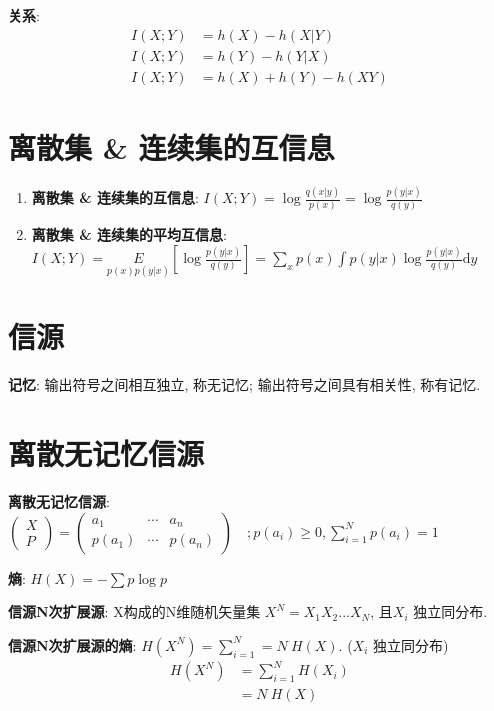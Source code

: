 \documentclass{article}
\newcommand{\env}[2]{\begin{#1}#2\end{#1}}
\newcommand{\d}{\mathrm d}
\newcommand{\l}{\left}
\newcommand{\r}{\right}
\begin{document}
                \textbf{关系}:
                    \env{align*}{
                        I(X;Y) &= h(X)-h(X|Y) \\
                        I(X;Y) &= h(Y)-h(Y|X) \\
                        I(X;Y) &= h(X)+h(Y)-h(X Y)
                    }
                    
            \section{离散集 \& 连续集的互信息}
                \env{enumerate}{
                    \item \textbf{离散集 \& 连续集的互信息}: $I(X;Y)=\log \frac{q(x|y)}{p(x)}=\log \frac{p(y|x)}{q(y)}$
                    \item \textbf{离散集 \& 连续集的平均互信息}: $I(X;Y)=\underset{p(x) p(y|x)}{E}\l[\log \frac{p(y|x)}{q(y)}\r]=\sum_{x} p(x) \int p(y|x) \log \frac{p(y|x)}{q(y)} \d y$
                }
            
            
\section{信源}

    \textbf{记忆}: 输出符号之间相互独立, 称无记忆; 输出符号之间具有相关性, 称有记忆.
    
    \section{离散无记忆信源}
        \textbf{离散无记忆信源}:  $ \l(\begin{array}{l} X \\ P \end{array}\r)
                 = \l(\begin{array}{lll}
                    a_1 & \cdots & a_{n} \\ p\l(a_1\r) & \cdots & p\l(a_{n}\r)
                \end{array}\r) \quad;
                p\l(a_{i}\r) \geqslant 0, \sum_{i=1}^N p\l(a_{i}\r)=1$
                
            
        \textbf{熵}: $H(X) = -\sum p \log p$
        
        \textbf{信源N次扩展源}: X构成的N维随机矢量集 $X^N = X_1 X_2...X_N$, 且$X_i$ 独立同分布.

        \textbf{信源N次扩展源的熵}: $H(X^N) = \sum_{i=1}^N = N\ H(X)$. ($X_i$ 独立同分布)
            \env{align*}{
                H(X^N) 
                &= \sum_{i=1}^N H(X_i)  \tag{$X_i$ 独立}\\
                &= N\ H(X)  \tag{$X_i$ 同分布}
            }
        
\end{document}
